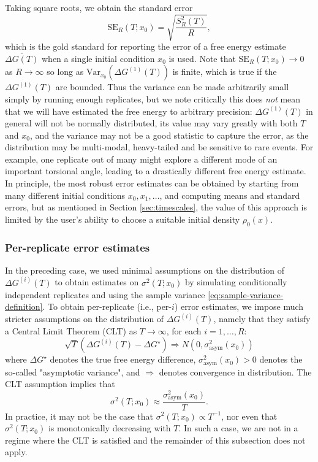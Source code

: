 \documentclass[9pt,bestpractices]{livecoms}
\begin{document}
Taking square roots, we obtain the standard error
\begin{equation}
  \mathrm{SE}_R (T ; x_0) = \sqrt{\frac{S_R^2(T)}{R}},
\end{equation}
which is the gold standard for reporting the error of a free energy estimate $\overline{\Delta G (T)} $ when a single initial condition $x_0$ is used. Note that $\mathrm{SE}_R
(T ; x_0) \rightarrow 0$ as $R \rightarrow \infty$ so long as $\mathrm{Var}_{x_0}(\Delta G^{(1)}(T))$ is finite, which is true if the $\Delta G^{(1)}(T)$ are bounded. Thus the variance can be made arbitrarily small simply by running enough replicates, but we note critically this does \textit{not} mean that we will have estimated the free energy to arbitrary precision: $\Delta G^{(1)}(T)$ in general will not be normally distributed, its value may vary greatly with both $T$ and $x_0$, and the variance may not be a good statistic to capture the error, as the distribution may be multi-modal, heavy-tailed and be sensitive to rare events. For example, one replicate out of many might explore a different mode of an important torsional angle, leading to a drastically different free energy estimate. 
In principle, the most robust error estimates can be obtained by starting from many different initial conditions $x_0, x_1, \dots$, and computing means and standard errors, but as mentioned in Section \ref{sec:timescales}, the value of this approach is limited by the user's ability to choose a suitable initial density $\rho_0(x)$.

\subsubsection{Per-replicate error estimates}

In the preceding case, we used minimal assumptions on the distribution of $\Delta G^{(i)}(T)$ to obtain estimates on $\sigma^2(T;x_0)$ by simulating conditionally independent replicates and using the sample variance \eqref{eq:sample-variance-definition}. To obtain per-replicate (i.e., per-$i$) error estimates, we impose much stricter assumptions on the distribution of $\Delta G^{(i)}(T)$,  namely that they satisfy a Central Limit Theorem (CLT) as $T\rightarrow \infty$, for each $i=1,\dots,R$:
$$ \sqrt{T} ( \Delta G^{(i)}(T) - \Delta G^\star) \Rightarrow N(0, \sigma^2_{\mathrm{asym}}(x_0))$$
where $\Delta G^\star$ denotes the true free energy difference, $\sigma_{\mathrm{asym}}^2(x_0)>0$ denotes the so-called "asymptotic variance", and $\Rightarrow$ denotes convergence in distribution. %
The CLT assumption implies that 
$$\sigma^2(T;x_0)\approx\frac{\sigma^2_{\mathrm{asym}}(x_0)}{T}.$$
In practice, it may not be the case that $\sigma^2(T;x_0)\propto T^{-1}$, nor even that $\sigma^2(T;x_0)$ is monotonically decreasing with $T$. In such a case, we are not in a regime where the CLT is satisfied and the remainder of this subsection does not apply.
\end{document}
